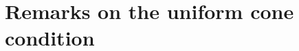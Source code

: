 \documentclass[a4paper,10pt]{amsart}
\numberwithin{equation}{section}
\begin{document}
%
%
%
%
%
%
%
%
%	










\appendix


\section{Remarks on the uniform cone condition}\label{appendix:cone and John}
\end{document}
